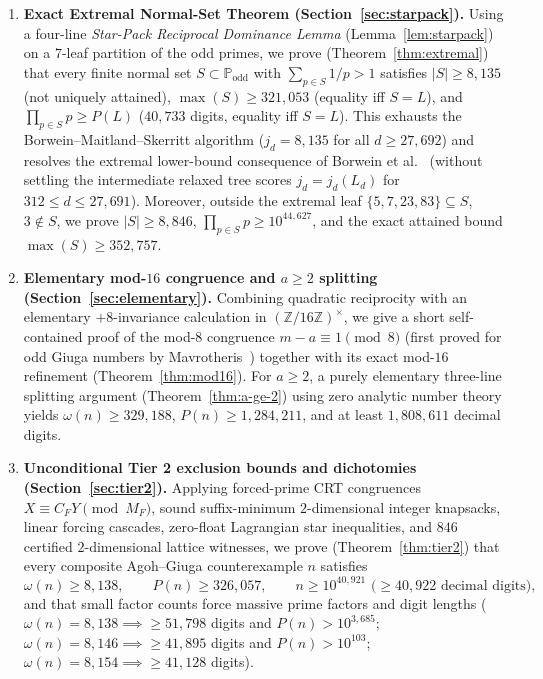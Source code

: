 \documentclass[11pt]{article}
\theoremstyle{remark}
\newcommand{\Podd}{\mathbb{P}_{\mathrm{odd}}}
\begin{document}
\begin{enumerate}
  \item \textbf{Exact Extremal Normal-Set Theorem (Section~\ref{sec:starpack}).}
  Using a four-line \emph{Star-Pack Reciprocal Dominance Lemma}
  (Lemma~\ref{lem:starpack}) on a $7$-leaf partition of the odd primes, we prove
  (Theorem~\ref{thm:extremal}) that every finite normal set $S \subset \Podd$
  with $\sum_{p\in S} 1/p > 1$ satisfies $|S| \ge 8{,}135$ (not uniquely
  attained), $\max(S) \ge 321{,}053$ (equality iff $S = L$), and
  $\prod_{p\in S} p \ge P(L)$ ($40{,}733$ digits, equality iff $S = L$). This
  exhausts the Borwein--Maitland--Skerritt algorithm ($j_d = 8{,}135$ for all
  $d \ge 27{,}692$) and resolves the extremal lower-bound consequence of Borwein
  et al.~\cite[Open Problem~5]{Borwein_1996} (without settling the intermediate
  relaxed tree scores $j_d = j_d(L_d)$ for $312 \le d \le 27{,}691$). Moreover,
  outside the extremal leaf $\{5,7,23,83\}\subseteq S$, $3\notin S$, we prove
  $|S| \ge 8{,}846$, $\prod_{p\in S} p \ge 10^{44{,}627}$, and the exact
  attained bound $\max(S) \ge 352{,}757$.

  \item \textbf{Elementary mod-$16$ congruence and $a \ge 2$ splitting
  (Section~\ref{sec:elementary}).} Combining quadratic reciprocity with an
  elementary $+8$-invariance calculation in $(\mathbb{Z}/16\mathbb{Z})^\times$,
  we give a short self-contained proof of the mod-$8$ congruence
  $m - a \equiv 1 \pmod 8$ (first proved for odd Giuga numbers by
  Mavrotheris~\cite{Mavrotheris2026}) together with its exact mod-$16$
  refinement (Theorem~\ref{thm:mod16}). For $a \ge 2$, a purely elementary
  three-line splitting argument (Theorem~\ref{thm:a-ge-2}) using zero analytic
  number theory yields $\omega(n) \ge 329{,}188$, $P(n) \ge 1{,}284{,}211$, and
  at least $1{,}808{,}611$ decimal digits.

  \item \textbf{Unconditional Tier 2 exclusion bounds and dichotomies
  (Section~\ref{sec:tier2}).} Applying forced-prime CRT congruences
  $X \equiv C_F Y \pmod{M_F}$, sound suffix-minimum $2$-dimensional integer
  knapsacks, linear forcing cascades, zero-float Lagrangian star inequalities,
  and $846$ certified $2$-dimensional lattice witnesses, we prove
  (Theorem~\ref{thm:tier2}) that every composite Agoh--Giuga counterexample $n$
  satisfies
  \[
    \omega(n) \ge 8{,}138,
    \qquad
    P(n) \ge 326{,}057,
    \qquad
    n \ge 10^{40{,}921} \text{ ($\ge 40{,}922$ decimal digits)},
  \]
  and that small factor counts force massive prime factors and digit lengths
  ($\omega(n)=8{,}138 \implies \ge 51{,}798$ digits and $P(n)>10^{3{,}685}$;
  $\omega(n)=8{,}146 \implies \ge 41{,}895$ digits and $P(n)>10^{103}$;
  $\omega(n)=8{,}154 \implies \ge 41{,}128$ digits).


\end{enumerate}
\end{document}

